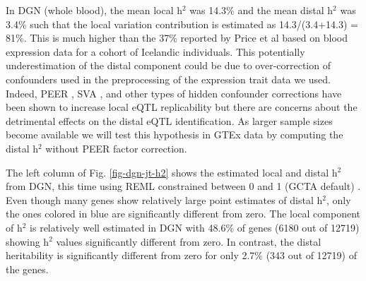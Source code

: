 \documentclass[10pt,letterpaper]{article}
\begin{document}
In DGN (whole blood), the mean local h$^2$ was 14.3\% and the mean distal h$^2$ was 3.4\% such that the local variation contribution is estimated as 14.3/(3.4+14.3) = 81\%. This is much higher than the 37\% reported by Price et al \cite{Price_2011} based on blood expression data for a cohort of Icelandic individuals. This potentially underestimation of the distal component could be due to over-correction of confounders used in the preprocessing of the expression trait data we used. Indeed, PEER \cite{Stegle_2012}, SVA \cite{Leek_2007}, and other types of hidden confounder corrections have been shown to increase local eQTL replicability but there are concerns about the detrimental effects on the distal eQTL identification. As larger sample sizes become available we will test this hypothesis in GTEx data by computing the distal h$^2$ without PEER factor correction.

The left column of Fig. \ref{fig-dgn-jt-h2} shows the estimated local and distal h$^2$ from DGN, this time using REML constrained between 0 and 1 (GCTA default) \cite{Yang_2011}. Even though many genes show relatively large point estimates of distal h$^2$, only the ones colored in blue are significantly different from zero. The local component of h$^2$ is relatively well estimated in DGN with 
48.6\% of genes  (6180 out of 12719) showing h$^2$ values significantly different from zero. In contrast, the distal heritability is significantly different from zero for only 2.7\% (343 out of 12719) of the genes. 
\end{document}
